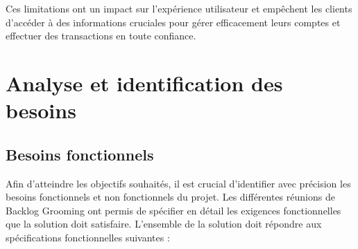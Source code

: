 Ces limitations ont un impact sur l'expérience utilisateur et empêchent les clients d'accéder à des informations cruciales pour gérer efficacement leurs comptes et effectuer des transactions en toute confiance. 

\section{Analyse et identification des besoins}
\subsection{Besoins fonctionnels}
Afin d'atteindre les objectifs souhaités, il est crucial d'identifier avec précision les besoins fonctionnels et non fonctionnels du projet. Les différentes réunions de Backlog Grooming ont permis de spécifier en détail les exigences fonctionnelles que la solution doit satisfaire. L'ensemble de la solution doit répondre aux spécifications fonctionnelles suivantes :

